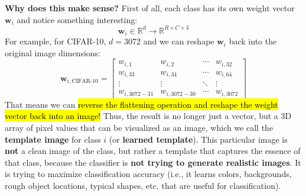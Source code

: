 \highspace
\textcolor{Green3}{ \textbf{Why does this make sense?}} First of all, each class has its own weight vector $\mathbf{w}_i$ and notice something interesting:
\begin{equation*}
    \mathbf{w}_i \in \mathbb{R}^{d} \to \mathbb{R}^{R \times C \times 3}
\end{equation*}
For example, for CIFAR-10, $d = 3072$ and we can reshape $\mathbf{w}_i$ back into the original image dimensions:
\begin{equation*}
    \mathbf{w}_{i, \text{CIFAR-10}} = \begin{bmatrix}
        w_{i, 1} & w_{i, 2} & \cdots & w_{i, 32} \\
        w_{i, 33} & w_{i, 34} & \cdots & w_{i, 64} \\
        \vdots & \vdots & \ddots & \vdots \\
        w_{i, 3072-31} & w_{i, 3072-30} & \cdots & w_{i, 3072}
    \end{bmatrix}
\end{equation*}
That means we can \hl{reverse the flattening operation and reshape the weight vector back into an image!} Thus, the result is no longer just a vector, but a 3D array of pixel values that can be visualized as an image, which we call the \textbf{template image} for class $i$ (or \textbf{learned template}). This particular image is \textbf{not} a clean image of the class, but rather a template that captures the essence of that class, because the classifier is \textbf{not trying to generate realistic images}. It is trying to maximize classification accuracy (i.e., it learns colors, backgrounds, rough object locations, typical shapes, etc. that are useful for classification).

